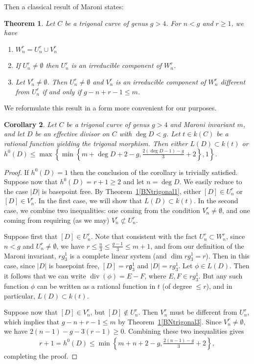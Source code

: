 \documentclass[11pt]{article}
\theoremstyle{plain}
\newtheorem{theorem}{Theorem}[section]
\newtheorem{corollary}[theorem]{Corollary}
\theoremstyle{definition}
\DeclareMathOperator{\divisor}{div}
\begin{document}
Then a classical result of Maroni \cite[Prop. 1]{MS} states:

\begin{theorem}
\label{BNtrigonal}
Let $C$ be a trigonal curve of genus $g>4$. For $n<g$ and $r\geq 1$, we have
\begin{enumerate}
\item  $W_n^r=U_n^r\cup V_n^r$\label{BNtrigonal1}
\item If $U_n^r\neq \emptyset$ then $U_n^r$ is an irreducible component of $W_n^r$.
\item Let $V_n^r\neq \emptyset$. Then $U_n^r\neq\emptyset$ and $V_n^r$ is an irreducible component of $W_n^r$ different from $U_n^r$ if and only if $g-n+r-1\leq m$.\label{BNtrigonal3}
\end{enumerate}
\end{theorem}

We reformulate this result in a form more convenient for our purposes.

\begin{corollary}
\label{h0bound2}
Let $C$ be a trigonal curve of genus $g>4$ and Maroni invariant $m$, and let $D$ be an effective divisor on $C$ with $\deg D<g$. Let $t\in k(C)$ be a rational function yielding the trigonal morphism. Then either $L(D)\subset k(t)$ or $h^0(D)\leq \max\left\{\min\left\{m+\deg D+2-g,\frac{2(\deg D-1)-g}{3}+2\right\},1\right\}$.
\end{corollary}

\begin{proof}
If $h^0(D)=1$ then the conclusion of the corollary is trivially satisfied. Suppose now that $h^0(D)=r+1\geq 2$ and let $n=\deg D$. We easily reduce to the case $|D|$ is basepoint free. By Theorem~\ref{BNtrigonal}\eqref{BNtrigonal1}, either $[D]\in U_n^r$ or $[D]\in V_n^r$. In the first case, we will show that $L(D)\subset k(t)$. In the second case, we combine two inequalities: one coming from the condition $V_n^r\neq\emptyset$, and one coming from requiring (as we may) $V_n^r\not\subset U_n^r$.

Suppose first that $[D]\in U_n^r$. Note that consistent with the fact $U_n^r\subset W_n^r$, since $n<g$ and $U_n^r\neq \emptyset$, we have $r\leq \frac{n}{3}\leq \frac{g-1}{3}\leq m+1$, and from our definition of the Maroni invariant, $rg_3^1$ is a complete linear system (and $\dim rg_3^1=r$). Then in this case, since $|D|$ is basepoint free, $[D]=r\mathfrak{g}_3^1$ and $|D|=rg_3^1$. Let $\phi\in L(D)$. Then it follows that we can write $\divisor(\phi)=E-F$, where $E,F\in rg_3^1$. But any such function $\phi$ can be written as a rational function in $t$ (of degree $\leq r$), and in particular, $L(D)\subset k(t)$.

Suppose now that $[D]\in V_n^r$, but $[D]\not\in U_n^r$. Then $V_n^r$ must be different from $U_n^r$, which implies that $g-n+r-1\leq m$ by Theorem~\ref{BNtrigonal}\eqref{BNtrigonal3}. Since $V_n^r\neq\emptyset$, we have $2(n-1)-g-3(r-1)\geq 0$. Combining these two inequalities gives
\begin{align*}
r+1=h^0(D)\leq \min\left\{m+n+2-g,\frac{2(n-1)-g}{3}+2\right\},
\end{align*}
completing the proof.
\end{proof}
\end{document}
